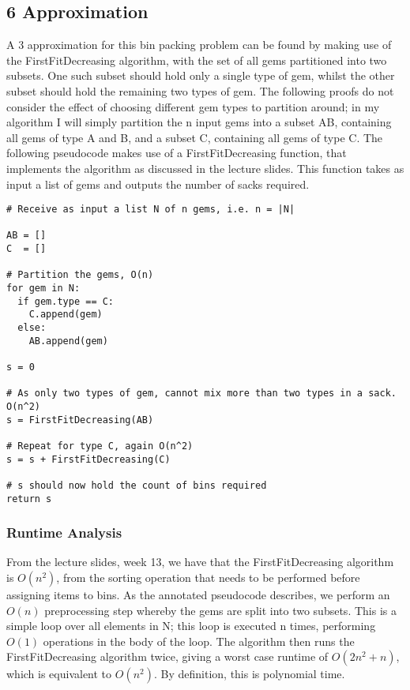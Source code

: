 \documentclass[paper=a4, fontsize=12pt]{article}
\begin{document}
\subsection{6 Approximation}

A 3 approximation for this bin packing problem can be found by making use of
the FirstFitDecreasing algorithm, with the set of all gems partitioned into two
subsets. One such subset should hold only a single type of gem, whilst the
other subset should hold the remaining two types of gem. The following proofs
do not consider the effect of choosing different gem types to partition around;
in my algorithm I will simply partition the n input gems into a subset AB,
containing all gems of type A and B, and a subset C, containing all gems of
type C. The following pseudocode makes use of a FirstFitDecreasing function,
that implements the algorithm as discussed in the lecture slides. This function
takes as input a list of gems and outputs the number of sacks required.

\begin{lstlisting}
# Receive as input a list N of n gems, i.e. n = |N|

AB = []
C  = []

# Partition the gems, O(n)
for gem in N:
  if gem.type == C:
    C.append(gem)
  else:
    AB.append(gem)

s = 0

# As only two types of gem, cannot mix more than two types in a sack. O(n^2)
s = FirstFitDecreasing(AB)

# Repeat for type C, again O(n^2)
s = s + FirstFitDecreasing(C)

# s should now hold the count of bins required
return s
\end{lstlisting}

\subsubsection{Runtime Analysis}
From the lecture slides, week 13, we have that the FirstFitDecreasing algorithm
is \(O(n^2)\), from the sorting operation that needs to be performed before
assigning items to bins. As the annotated pseudocode describes, we perform an
\(O(n)\) preprocessing step whereby the gems are split into two subsets. This
is a simple loop over all elements in N; this loop is executed n times,
performing \(O(1)\) operations in the body of the loop. The algorithm then runs
the FirstFitDecreasing algorithm twice, giving a worst case runtime of \(O(2n^2
+ n)\), which is equivalent to \(O(n^2)\). By definition, this is polynomial
time.
\end{document}
